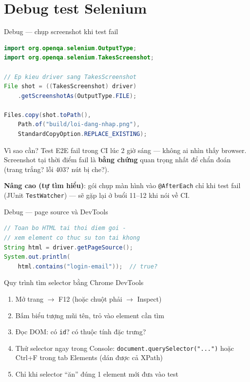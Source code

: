 \documentclass[aspectratio=169,12pt]{beamer}
\begin{document}
\section{Debug test Selenium}

\begin{frame}[fragile]{Debug --- chụp screenshot khi test fail}
\begin{lstlisting}[language=java,basicstyle=\ttfamily\scriptsize]
import org.openqa.selenium.OutputType;
import org.openqa.selenium.TakesScreenshot;

// Ep kieu driver sang TakesScreenshot
File shot = ((TakesScreenshot) driver)
    .getScreenshotAs(OutputType.FILE);

Files.copy(shot.toPath(),
    Path.of("build/loi-dang-nhap.png"),
    StandardCopyOption.REPLACE_EXISTING);
\end{lstlisting}

  \begin{block}{Vì sao cần?}
    \small
    Test E2E fail trong CI lúc 2 giờ sáng --- không ai nhìn thấy browser.
    Screenshot tại thời điểm fail là \textbf{bằng chứng} quan trọng nhất
    để chẩn đoán (trang trắng? lỗi 403? nút bị che?).
  \end{block}

  {\small \textbf{Nâng cao (tự tìm hiểu)}: gói chụp màn hình vào
  \texttt{@AfterEach} chỉ khi test fail (JUnit \texttt{TestWatcher}) ---
  sẽ gặp lại ở buổi 11--12 khi nói về CI.}
\end{frame}

\begin{frame}[fragile]{Debug --- page source và DevTools}
\begin{lstlisting}[language=java]
// Toan bo HTML tai thoi diem goi -
// xem element co thuc su ton tai khong
String html = driver.getPageSource();
System.out.println(
    html.contains("login-email"));  // true?
\end{lstlisting}

  \begin{block}{Quy trình tìm selector bằng Chrome DevTools}
    \begin{enumerate}
      \item Mở trang $\to$ F12 (hoặc chuột phải $\to$ Inspect)
      \item Bấm biểu tượng mũi tên, trỏ vào element cần tìm
      \item Đọc DOM: có \texttt{id}? có thuộc tính đặc trưng?
      \item Thử selector ngay trong Console:
            \texttt{document.querySelector("...")} hoặc
            Ctrl+F trong tab Elements (dán được cả XPath)
      \item Chỉ khi selector ``ăn'' đúng 1 element mới đưa vào test
    \end{enumerate}
  \end{block}
\end{frame}
\end{document}
